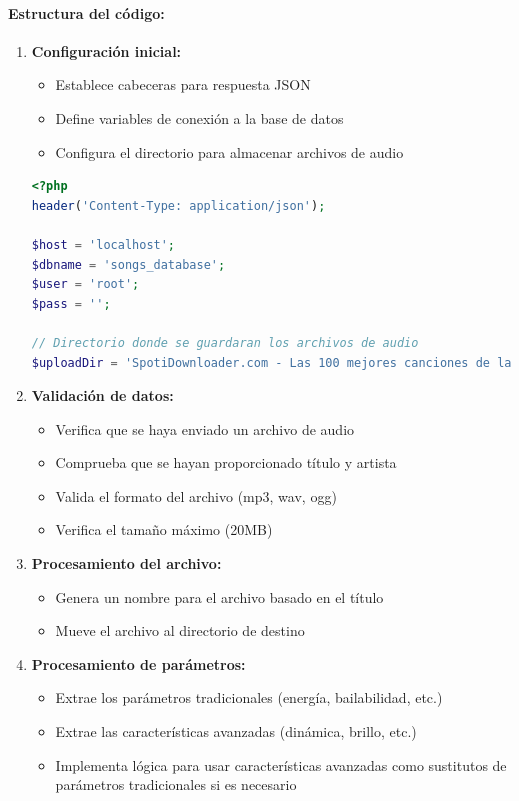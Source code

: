 \documentclass[a4paper,12pt]{article}
\begin{document}
\paragraph{Estructura del código:}
\begin{enumerate}
    \item \textbf{Configuración inicial:}
    \begin{itemize}
        \item Establece cabeceras para respuesta JSON
        \item Define variables de conexión a la base de datos
        \item Configura el directorio para almacenar archivos de audio
    \end{itemize}
    
    \begin{lstlisting}[language=PHP]
<?php
header('Content-Type: application/json');

$host = 'localhost';
$dbname = 'songs_database';
$user = 'root';
$pass = '';

// Directorio donde se guardaran los archivos de audio
$uploadDir = 'SpotiDownloader.com - Las 100 mejores canciones de la historia del Rock/';
    \end{lstlisting}
    
    \item \textbf{Validación de datos:}
    \begin{itemize}
        \item Verifica que se haya enviado un archivo de audio
        \item Comprueba que se hayan proporcionado título y artista
        \item Valida el formato del archivo (mp3, wav, ogg)
        \item Verifica el tamaño máximo (20MB)
    \end{itemize}
    
    \item \textbf{Procesamiento del archivo:}
    \begin{itemize}
        \item Genera un nombre para el archivo basado en el título
        \item Mueve el archivo al directorio de destino
    \end{itemize}
    
    \item \textbf{Procesamiento de parámetros:}
    \begin{itemize}
        \item Extrae los parámetros tradicionales (energía, bailabilidad, etc.)
        \item Extrae las características avanzadas (dinámica, brillo, etc.)
        \item Implementa lógica para usar características avanzadas como sustitutos de parámetros tradicionales si es necesario
    \end{itemize}
    

\end{enumerate}
\end{document}
